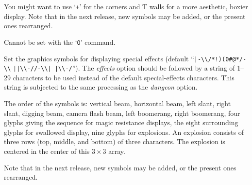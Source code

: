You might want to use `{\tt +}' for the corners and T walls for a more
aesthetic, boxier display.  Note that in the next release, new symbols
may be added, or the present ones rearranged.

Cannot be set with the `{\tt O}' command.
\item[\ib{effects}]
Set the graphics symbols for displaying special effects (default
``\verb&|-\\/*!)(0#@*/-\\& \verb&||\\-//-\\| |\\-/&'').
The {\it effects\/} option should be
followed by a string of 1--29
characters to be used instead of the default special-effects characters.
This string is subjected to the same processing as the {\it dungeon\/} option.

The order of the symbols is:  vertical beam, horizontal beam, left slant,
right slant, digging beam, camera flash beam, left boomerang, right boomerang,
four glyphs giving the sequence for magic resistance displays,
the eight surrounding glyphs for swallowed display,
nine glyphs for explosions.
An explosion consists of three rows (top, middle, and bottom) of three
characters.  The explosion is centered in the center of this $3 \times 3$
array.

Note that in the next release, new symbols may be added,
or the present ones rearranged.

